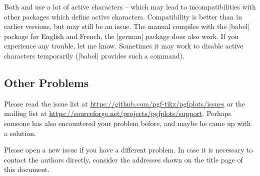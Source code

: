 Both \PGF{} and \PGFPlots{} use a lot of active characters -- which may lead to
incompatibilities with other packages which define active characters.
Compatibility is better than in earlier versions, but may still be an issue.
The manual compiles with the |babel| package for English and French, the
|german| package does also work. If you experience any trouble, let me know.
Sometimes it may work to disable active characters temporarily (|babel|
provides such a command).


\subsection{Other Problems}

Please read the issue list at \url{https://github.com/pgf-tikz/pgfplots/issues}
or the mailing list at \url{https://sourceforge.net/projects/pgfplots/support}.
Perhaps someone has
also encountered your problem before, and maybe he came up with a solution.

Please open a new issue if you have a different problem. In
case it is necessary to contact the authors directly, consider the addresses
shown on the title page of this document.
